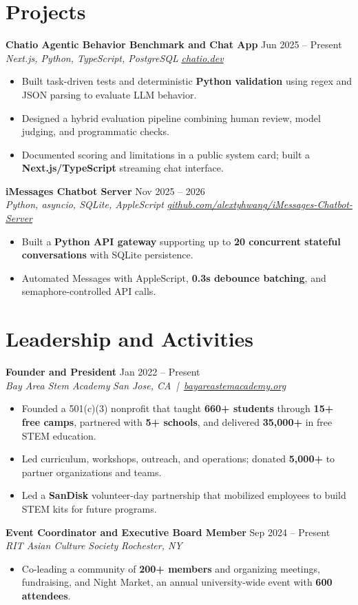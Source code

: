\documentclass[10pt,letterpaper]{article}
\newif\ifresumeFirstRole
\newcommand{\resumeRole}[4]{%
  \ifresumeFirstRole
    \global\resumeFirstRolefalse
  \else
    \vspace{0pt plus 1fill}%
  \fi
  \textbf{#1} \hfill #2\\
  \textit{#3} \hfill \textit{#4}
}
\begin{document}
\section*{Projects}
\resumeRole{Chatio Agentic Behavior Benchmark and Chat App}{Jun 2025 -- Present}{Next.js, Python, TypeScript, PostgreSQL}{\href{https://chatio.dev}{chatio.dev}}
\begin{itemize}
  \item Built task-driven tests and deterministic \textbf{Python validation} using regex and JSON parsing to evaluate LLM behavior.
  \item Designed a hybrid evaluation pipeline combining human review, model judging, and programmatic checks.
  \item Documented scoring and limitations in a public system card; built a \textbf{Next.js/TypeScript} streaming chat interface.
\end{itemize}

\resumeRole{iMessages Chatbot Server}{Nov 2025 -- 2026}{Python, asyncio, SQLite, AppleScript}{\href{https://github.com/alextyhwang/iMessages-Chatbot-Server}{github.com/alextyhwang/iMessages-Chatbot-Server}}
\begin{itemize}
  \item Built a \textbf{Python API gateway} supporting up to \textbf{20 concurrent stateful conversations} with SQLite persistence.
  \item Automated Messages with AppleScript, \textbf{0.3s debounce batching}, and semaphore-controlled API calls.
\end{itemize}

\section*{Leadership and Activities}
\resumeRole{Founder and President}{Jan 2022 -- Present}{Bay Area Stem Academy}{San Jose, CA \,|\, \href{https://bayareastemacademy.org}{bayareastemacademy.org}}
\begin{itemize}
  \item Founded a 501(c)(3) nonprofit that taught \textbf{660+ students} through \textbf{15+ free camps}, partnered with \textbf{5+ schools}, and delivered \textbf{\textdollar{}35,000+} in free STEM education.
  \item Led curriculum, workshops, outreach, and operations; donated \textbf{\textdollar{}5,000+} to partner organizations and teams.
  \item Led a \textbf{SanDisk} volunteer-day partnership that mobilized employees to build STEM kits for future programs.
\end{itemize}

\resumeRole{Event Coordinator and Executive Board Member}{Sep 2024 -- Present}{RIT Asian Culture Society}{Rochester, NY}
\begin{itemize}
  \item Co-leading a community of \textbf{200+ members} and organizing meetings, fundraising, and Night Market, an annual university-wide event with \textbf{600 attendees}.
\end{itemize}
\end{document}
